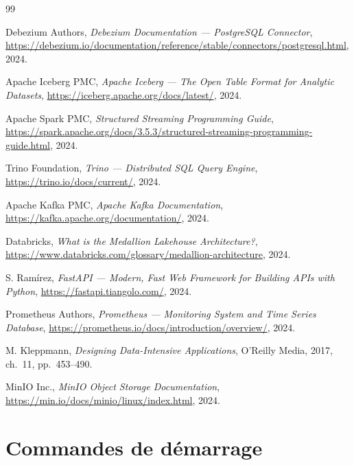 \documentclass[12pt,a4paper]{report}
\begin{document}
\begin{thebibliography}{99}

Debezium Authors,
\textit{Debezium Documentation --- PostgreSQL Connector},
\url{https://debezium.io/documentation/reference/stable/connectors/postgresql.html},
2024.

Apache Iceberg PMC,
\textit{Apache Iceberg --- The Open Table Format for Analytic Datasets},
\url{https://iceberg.apache.org/docs/latest/},
2024.

Apache Spark PMC,
\textit{Structured Streaming Programming Guide},
\url{https://spark.apache.org/docs/3.5.3/structured-streaming-programming-guide.html},
2024.

Trino Foundation,
\textit{Trino --- Distributed SQL Query Engine},
\url{https://trino.io/docs/current/},
2024.

Apache Kafka PMC,
\textit{Apache Kafka Documentation},
\url{https://kafka.apache.org/documentation/},
2024.

Databricks,
\textit{What is the Medallion Lakehouse Architecture?},
\url{https://www.databricks.com/glossary/medallion-architecture},
2024.

S. Ramírez,
\textit{FastAPI --- Modern, Fast Web Framework for Building APIs with Python},
\url{https://fastapi.tiangolo.com/},
2024.

Prometheus Authors,
\textit{Prometheus --- Monitoring System and Time Series Database},
\url{https://prometheus.io/docs/introduction/overview/},
2024.

M. Kleppmann,
\textit{Designing Data-Intensive Applications},
O'Reilly Media, 2017, ch.~11, pp.~453--490.

MinIO Inc.,
\textit{MinIO Object Storage Documentation},
\url{https://min.io/docs/minio/linux/index.html},
2024.

\end{thebibliography}

\appendix

\chapter{Commandes de démarrage}
\end{document}
